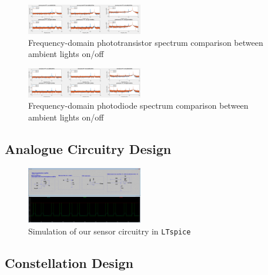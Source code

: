 \documentclass[conference]{IEEEtran}
\begin{document}
\begin{figure}[htbp]
	\centerline{\includegraphics[width=0.45\textwidth]{sensor-phototransistor-sensitivity.png}}
	\caption{Frequency-domain phototransistor spectrum comparison between ambient lights on/off}
	\label{fig:sensor-phototransistor-sensitivity}
\end{figure}
\begin{figure}[htbp]
	\centerline{\includegraphics[width=0.45\textwidth]{sensor-photodiode-sensitivity.png}}
	\caption{Frequency-domain photodiode spectrum comparison between ambient lights on/off}
	\label{fig:sensor-photodiode-sensitivity}
\end{figure}

\subsection{Analogue Circuitry Design}

\begin{figure}[htbp]
	\centerline{\includegraphics[width=0.45\textwidth]{sensor-spice.png}}
	\caption{Simulation of our sensor circuitry in \texttt{LTspice}}
	\label{fig:sensor-spice}
\end{figure}

\subsection{Constellation Design}
\end{document}
